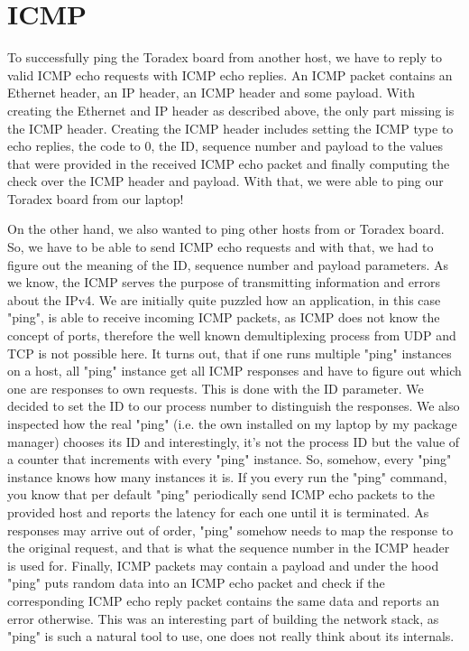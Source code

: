 \section{ICMP}

To successfully ping the Toradex board from another host, we have to reply to
valid ICMP echo requests with ICMP echo replies. An ICMP packet contains an
Ethernet header, an IP header, an ICMP header and some payload. With creating
the Ethernet and IP header as described above, the only part missing is the ICMP
header. Creating the ICMP header includes setting the ICMP type to echo replies,
the code to 0, the ID, sequence number and payload to the values that were
provided in the received ICMP echo packet and finally computing the check over
the ICMP header and payload. With that, we were able to ping our Toradex board
from our laptop!

On the other hand, we also wanted to ping other hosts from or Toradex board. So,
we have to be able to send ICMP echo requests and with that, we had to figure
out the meaning of the ID, sequence number and payload parameters.  As we know,
the ICMP serves the purpose of transmitting information and errors about the
IPv4. We are initially quite puzzled how an application, in this case "ping", is
able to receive incoming ICMP packets, as ICMP does not know the concept of
ports, therefore the well known demultiplexing process from UDP and TCP is not
possible here.  It turns out, that if one runs multiple "ping" instances on a
host, all "ping" instance get all ICMP responses and have to figure out which
one are responses to own requests. This is done with the ID parameter. We
decided to set the ID to our process number to distinguish the responses. We
also inspected how the real "ping" (i.e. the own installed on my laptop by my
package manager) chooses its ID and interestingly, it's not the process ID but
the value of a counter that increments with every "ping" instance. So, somehow,
every "ping" instance knows how many instances it is.  If you every run the
"ping" command, you know that per default "ping" periodically send ICMP echo
packets to the provided host and reports the latency for each one until it is
terminated. As responses may arrive out of order, "ping" somehow needs to map
the response to the original request, and that is what the sequence number in
the ICMP header is used for.  Finally, ICMP packets may contain a payload and
under the hood "ping" puts random data into an ICMP echo packet and check if the
corresponding ICMP echo reply packet contains the same data and reports an error
otherwise.  This was an interesting part of building the network stack, as
"ping" is such a natural tool to use, one does not really think about its
internals.

